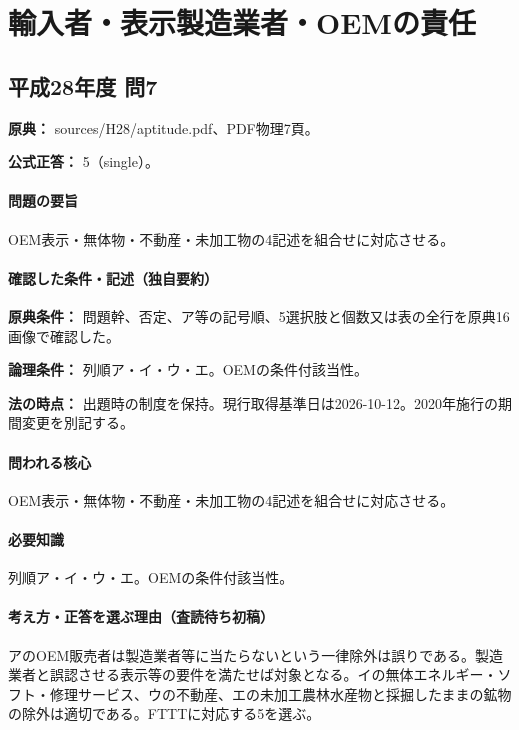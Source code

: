 \section{輸入者・表示製造業者・OEMの責任}

\subsection{平成28年度 問7}
\label{q:h28-reg-apt-07}

\noindent\textbf{原典：} sources/H28/aptitude.pdf、PDF物理7頁。

\textbf{公式正答：} 5（single）。

\paragraph{問題の要旨} OEM表示・無体物・不動産・未加工物の4記述を組合せに対応させる。

\paragraph{確認した条件・記述（独自要約）}\mbox{}\par

\noindent\textbf{原典条件：} 問題幹、否定、ア等の記号順、5選択肢と個数又は表の全行を原典16画像で確認した。\par

\noindent\textbf{論理条件：} 列順ア・イ・ウ・エ。OEMの条件付該当性。\par

\noindent\textbf{法の時点：} 出題時の制度を保持。現行取得基準日は2026-10-12。2020年施行の期間変更を別記する。\par

\paragraph{問われる核心} OEM表示・無体物・不動産・未加工物の4記述を組合せに対応させる。

\paragraph{必要知識} 列順ア・イ・ウ・エ。OEMの条件付該当性。

\paragraph{考え方・正答を選ぶ理由（査読待ち初稿）} アのOEM販売者は製造業者等に当たらないという一律除外は誤りである。製造業者と誤認させる表示等の要件を満たせば対象となる。イの無体エネルギー・ソフト・修理サービス、ウの不動産、エの未加工農林水産物と採掘したままの鉱物の除外は適切である。FTTTに対応する5を選ぶ。

